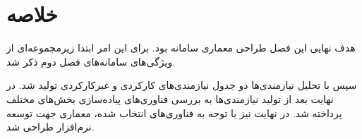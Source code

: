 \section{خلاصه}


هدف نهایی این فصل طراحی معماری سامانه بود. برای این امر ابتدا زیرمجموعه‌ای از ویژگی‌های سامانه‌های فصل دوم ذکر شد.

سپس با تحلیل نیازمندی‌ها دو جدول نیازمندی‌های کارکردی و غیرکارکردی تولید شد. در نهایت بعد از تولید نیازمندی‌ها به بررسی فناوری‌های پیاده‌سازی بخش‌های مختلف پرداخته شد. در نهایت نیز با توجه به فناوری‌های انتخاب شده، معماری جهت توسعه نرم‌افزار طراحی شد.

